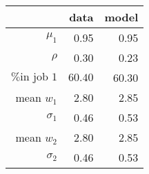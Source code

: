 \begin{table}[!h]
\centering
 \caption{} \;\begin{tabular}{rrr}
\toprule
 & \textbf{data} & \textbf{model}\\
\midrule
$\mu_1$ & 0.95 & 0.95\\
$\rho$ & 0.30 & 0.23\\
$\textrm{\% in job 1}$ & $60.40$ & 60.30\\
mean $w_1$ & 2.80 & 2.85\\
$\sigma_1$ & 0.46 & 0.53\\
mean $w_2$ & 2.80 & 2.85\\
$\sigma_2$ & 0.46 & 0.53\\
\bottomrule
\end{tabular}
\end{table}